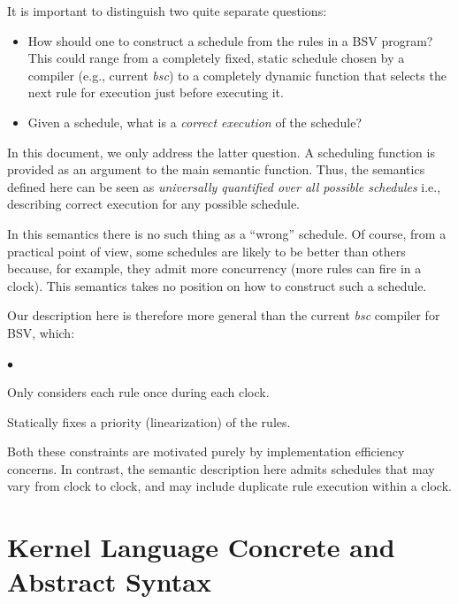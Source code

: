 \documentclass[11pt]{article}
\newenvironment{tightlist}%
{\begin{list}{$\bullet$}{%
    \setlength{\topsep}{0in}
    \setlength{\partopsep}{0in}
    \setlength{\itemsep}{0in}
    \setlength{\parsep}{0in}
    \setlength{\leftmargin}{1.5em}
    \setlength{\rightmargin}{0in}
    \setlength{\itemindent}{0in}
}
}%
{\end{list}
}
\begin{document}
It is important to distinguish two quite separate questions:

\begin{itemize}

\item How should one to construct a schedule from the rules in a BSV
program?  This could range from a completely fixed, static schedule
chosen by a compiler (e.g., current \emph{bsc}) to a completely
dynamic function that selects the next rule for execution just before
executing it.

\item Given a schedule, what is a \emph{correct execution} of the schedule?

\end{itemize}

In this document, we only address the latter question.  A scheduling
function is provided as an argument to the main semantic function.
Thus, the semantics defined here can be seen as \emph{universally
quantified over all possible schedules} i.e., describing correct
execution for any possible schedule.

In this semantics there is no such thing as a ``wrong'' schedule.  Of
course, from a practical point of view, some schedules are likely to
be better than others because, for example, they admit more
concurrency (more rules can fire in a clock).  This semantics takes no
position on how to construct such a schedule.

Our description here is therefore more general than the current
\emph{bsc} compiler for BSV, which:

\begin{tightlist}

\item Only considers each rule once during each clock.

\item Statically fixes a priority (linearization) of the rules.

\end{tightlist}

Both these constraints are motivated purely by implementation
efficiency concerns.  In contrast, the semantic description here
admits schedules that may vary from clock to clock, and may include
duplicate rule execution within a clock.


\section{Kernel Language Concrete and Abstract Syntax}
\end{document}
